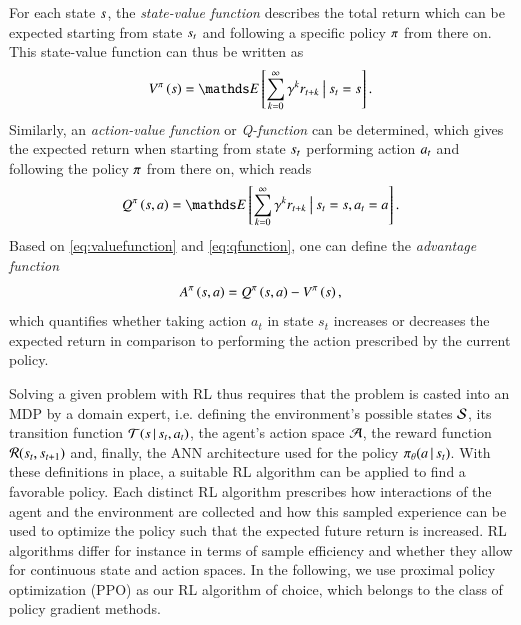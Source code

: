 For each state $s$, the \textit{state-value function} describes the total return which can be expected starting from state $s_t$ and following a specific policy $\pi$ from there on.
This state-value function can thus be written as
\begin{equation}
  \valuefunction^\policy \left(\state\right) = \expectation\left[\sum_{k=0}^\infty \discount^k r_{t+k}\given\state_t=\state\right] \eqnperiod
  \label{eq:valuefunction}
\end{equation}
Similarly, an \textit{action-value function} or \textit{Q-function} can be determined, which gives the expected return when starting from state $s_t$ performing action $a_t$ and following the policy $\pi$ from there on, which reads
\begin{equation}
  \qfunction^\policy \left(\state,\action\right) = \expectation\left[\sum_{k=0}^\infty \discount^k r_{t+k}\given\state_t=\state, \action_t=\action\right] \eqnperiod
  \label{eq:qfunction}
\end{equation}
Based on \eqref{eq:valuefunction} and \eqref{eq:qfunction}, one can define the \textit{advantage function}
\begin{equation}
  A^\pi \left(s,a\right) =  Q^\pi \left(s,a\right) - V^\pi \left(s\right) ,
  \label{eq:advantagefunction}
\end{equation}
which quantifies whether taking action $a_t$ in state $s_t$ increases or decreases the expected return in comparison to performing the action prescribed by the current policy.

Solving a given problem with RL thus requires that the problem is casted into an MDP by a domain expert, i.e. defining the environment's possible states $\mathcal{S}$, its transition function $\mathcal{T}(s \,|\, s_t ,a_t )$, the agent's action space $\mathcal{A}$, the reward function $\mathcal{R}(s_t,s_{t+1})$ and, finally, the ANN architecture used for the policy $\pi_{\theta}(a \,|\, s_t )$.
With these definitions in place, a suitable RL algorithm can be applied to find a favorable policy.
Each distinct RL algorithm prescribes how interactions of the agent and the environment are collected and how this sampled experience can be used to optimize the policy such that the expected future return is increased.
RL algorithms differ for instance in terms of sample efficiency and whether they allow for continuous state and action spaces.
In the following, we use proximal policy optimization (PPO) as our RL algorithm of choice, which belongs to the class of policy gradient methods.





